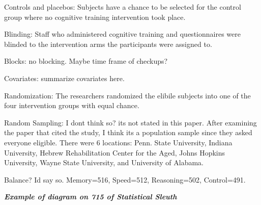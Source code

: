 \documentclass[11pt]{article}
\begin{document}
Controls and placebos: Subjects have a chance to be selected for the control group where no cognitive training intervention took place.

Blinding: Staff who administered cognitive training and questionnaires were blinded to the intervention arms the participants were assigned to.

Blocks: no blocking. Maybe time frame of checkups?

Covariates: summarize covariates here.

Randomization: The researchers randomized the elibile subjects into one of the four intervention groups with equal chance.

Random Sampling: I dont think so? its not stated in this paper. After examining the paper that cited the study, I think its a population sample since they asked everyone eligible. There were 6 locations: Penn. State University, Indiana University, Hebrew Rehabilitation Center for the Aged, Johns Hopkins University, Wayne State University, and University of Alabama.

Balance? Id say so. Memory=516, Speed=512, Reasoning=502, Control=491. 



\textbf{\textbf{\emph{Example of diagram on 715 of Statistical Sleuth}}}
\end{document}
